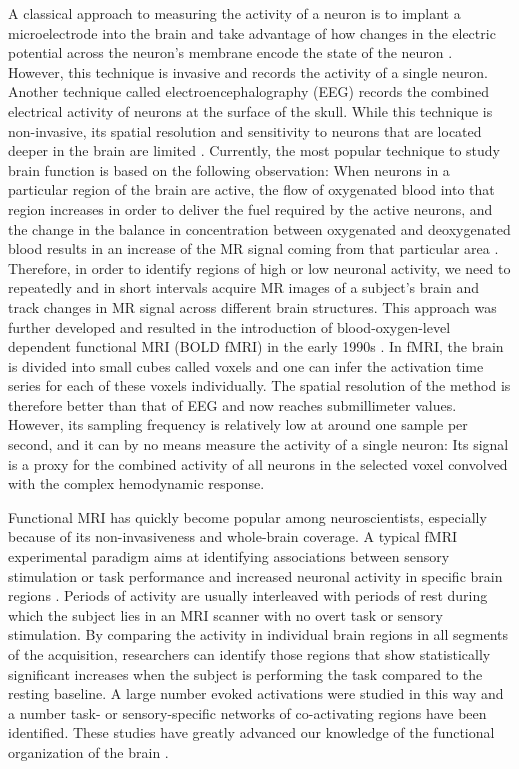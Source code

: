 A classical approach to measuring the activity of a neuron is to implant a
microelectrode into the brain and take advantage of how changes in the electric
potential across the neuron's membrane encode the state of the neuron
\parencite{hubel1959, adrian1928}. However, this technique is invasive and
records the activity of a single neuron. Another technique called
electroencephalography (EEG) records the combined electrical activity of neurons
at the surface of the skull. While this technique is non-invasive, its spatial
resolution and sensitivity to neurons that are located deeper in the brain are
limited \parencite{jackson2014}. Currently, the most popular technique to study
brain function is based on the following observation: When neurons in a
particular region of the brain are active, the flow of oxygenated blood into
that region increases in order to deliver the fuel required by the active
neurons, and the change in the balance in concentration between oxygenated and
deoxygenated blood results in an increase of the MR signal coming from that
particular area \parencite{ogawa1990}. Therefore, in order to identify regions
of high or low neuronal activity, we need to repeatedly and in short intervals
acquire MR images of a subject's brain and track changes in MR signal across
different brain structures. This approach was further developed and resulted in
the introduction of blood-oxygen-level dependent functional MRI (BOLD fMRI) in
the early 1990s \parencite{bandettini1992,kwong1992}. In fMRI, the brain is
divided into small cubes called voxels and one can infer the activation time
series for each of these voxels individually. The spatial resolution of the
method is therefore better than that of EEG and now reaches submillimeter
values. However, its sampling frequency is relatively low at around one sample
per second, and it can by no means measure the activity of a single neuron: Its
signal is a proxy for the combined activity of all neurons in the selected
voxel convolved with the complex hemodynamic response.

Functional MRI has quickly become popular among neuroscientists, especially
because of its non-invasiveness and whole-brain coverage. A typical fMRI
experimental paradigm aims at identifying associations between sensory
stimulation or task performance and increased neuronal activity in specific
brain regions \parencite{friston1994}. Periods of activity are usually
interleaved with periods of rest during which the subject lies in an MRI scanner
with no overt task or sensory stimulation. By comparing the activity in
individual brain regions in all segments of the acquisition, researchers can
identify those regions that show statistically significant increases when the
subject is performing the task compared to the resting baseline. A large number
evoked activations were studied in this way and a number task- or
sensory-specific networks of co-activating regions have been identified.  These
studies have greatly advanced our knowledge of the functional organization of
the brain \parencite{poldrack2015a}.

